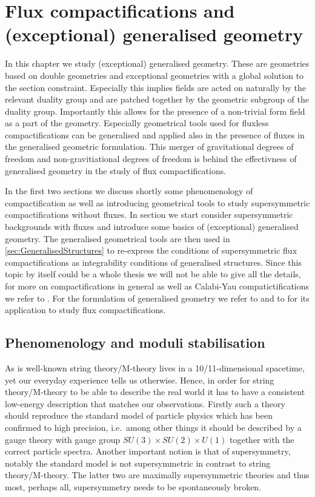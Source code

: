 \chapter{Flux compactifications and (exceptional) generalised
geometry\label{chap:FluxCompactifications}}

In this chapter we study (exceptional) generalised geometry. These are geometries based on double geometries and exceptional geometries with a global solution to the section constraint. Especially this implies fields are acted on naturally by the relevant duality group and are patched together by the geometric subgroup of the duality group. Importantly this allows for the presence of a non-trivial form field as a part of the geometry. Especially geometrical tools used for fluxless compactifications can be generalised and applied also in the presence of fluxes in the generalised geometric formulation. This merger of gravitational degrees of freedom and non-gravitiational degrees of freedom is behind the effectivness of generalised geometry in the study of flux compactifications. 

In the first two sections we discuss shortly some phenomenology of compactification as well as introducing geometrical tools to study supersymmetric compactifications without fluxes. In section we start consider supersymmetric backgrounds with fluxes and introduce some basics of (exceptional) generalised geometry. The generalised geometrical tools are then used in \ref{sec:GeneralisedStructures} to re-express the conditions of supersymmetric flux compactifications as integrability conditions of generalised structures. Since this topic by itself could be a whole thesis we will not be able to give all the details, for more on compactifications in general as well as Calabi-Yau compatictifications we refer to \cite{Blumenhagen2013,Grana:2005jc}. For the formulation of generalised geometry we refer to \cite{Hull:2007zu,Coimbra:2011ky,Coimbra:2011nw} and to \cite{Ashmore:2015joa,Grana:2009im} for its application to study flux compactifications. 

\section{Phenomenology and moduli stabilisation}
As is well-known string theory/M-theory lives in a 10/11-dimensional spacetime, yet our everyday experience tells us otherwise. Hence, in order for string theory/M-theory to be able to describe the real world it has to have a consistent low-energy description that matches our observations. Firstly such a theory should reproduce the standard model of particle physics which has been confirmed to high precision, i.e.\ among other things it should be described by a gauge theory with gauge group $SU(3)\times SU(2)\times U(1)$ together with the correct particle spectra. Another important notion is that of supersymmetry, notably the standard model is not supersymmetric in contrast to string theory/M-theory. The latter two are maximally supersymmetric theories and thus most, perhaps all, supersymmetry needs to be spontaneously broken. %

